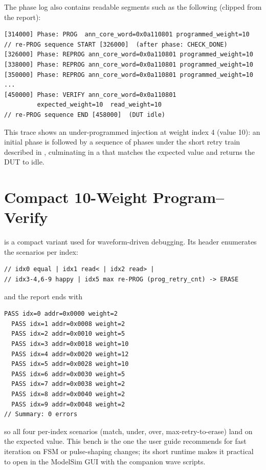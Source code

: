 The phase log also contains readable segments such as the following
(clipped from the report):

\begin{lstlisting}[style=plainstyle,language={}]
[314000] Phase: PROG  ann_core_word=0x0a110801 programmed_weight=10
// re-PROG sequence START [326000]  (after phase: CHECK_DONE)
[326000] Phase: REPROG ann_core_word=0x0a110801 programmed_weight=10
[338000] Phase: REPROG ann_core_word=0x0a110801 programmed_weight=10
[350000] Phase: REPROG ann_core_word=0x0a110801 programmed_weight=10
...
[450000] Phase: VERIFY ann_core_word=0x0a110801
         expected_weight=10  read_weight=10
// re-PROG sequence END [458000]  (DUT idle)
\end{lstlisting}

This trace shows an under-programmed injection at weight index 4 (value
10): an initial  phase is followed by a sequence of 
phases under the short retry train described in
, culminating in a  that
matches the expected value and returns the DUT to idle.

\section{Compact 10-Weight Program--Verify}
\label{sec:results-10w}

 is a compact variant used
for waveform-driven debugging. Its header enumerates the scenarios per
index:

\begin{lstlisting}[style=plainstyle,language={}]
// idx0 equal | idx1 read< | idx2 read> |
// idx3-4,6-9 happy | idx5 max re-PROG (prog_retry_cnt) -> ERASE
\end{lstlisting}

and the report ends with

\begin{lstlisting}[style=plainstyle,language={}]
  PASS idx=0 addr=0x0000 weight=2
  PASS idx=1 addr=0x0008 weight=2
  PASS idx=2 addr=0x0010 weight=5
  PASS idx=3 addr=0x0018 weight=10
  PASS idx=4 addr=0x0020 weight=12
  PASS idx=5 addr=0x0028 weight=10
  PASS idx=6 addr=0x0030 weight=5
  PASS idx=7 addr=0x0038 weight=2
  PASS idx=8 addr=0x0040 weight=2
  PASS idx=9 addr=0x0048 weight=2
// Summary: 0 errors
\end{lstlisting}

so all four per-index scenarios (match, under, over, max-retry-to-erase)
land on the expected value. This bench is the one the user guide
recommends for fast iteration on FSM or pulse-shaping changes; its
short runtime makes it practical to open in the ModelSim GUI with the
companion wave  scripts.

